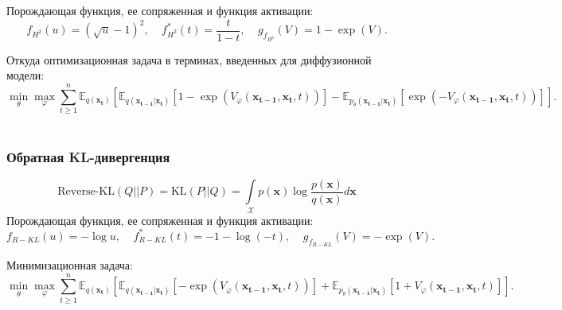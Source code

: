 \documentclass{article}
\begin{document}
Порождающая функция, ее сопряженная и функция активации:
\begin{equation}
	f_{H^2}(u) = (\sqrt{u} - 1)^2, ~~~~~ f^*_{H^2}(t) = \frac{t}{1 - t}, ~~~~~ g_{f_{H^2}}(V) = 1 - \exp(V).
\end{equation}

Откуда оптимизационная задача в терминах, введенных для диффузионной модели:
 \begin{equation}
	\min\limits_\theta\max\limits_\varphi\sum\limits_{t\geqslant 1}^n \mathbb{E}_{q(\mathbf{x_t})}\left[\mathbb{E}_{q(\mathbf{x_{t-1}}|\mathbf{x_t})}[1 - \exp{(V_\varphi(\mathbf{x_{t-1}}, \mathbf{x_t}, t))}] - \mathbb{E}_{p_\theta(\mathbf{x_{t-1}}|\mathbf{x_t})}[\exp{(-V_\varphi(\mathbf{x_{t-1}}, \mathbf{x_t}, t))}]\right].
\end{equation}\\

\subsubsection{Обратная KL-дивергенция}
 \begin{equation}
	\text{Reverse-KL}(Q||P) = \text{KL}(P||Q) = \int\limits_\mathcal{X} p(\mathbf{x})\log{\frac{p(\mathbf{x})}{q(\mathbf{x})}}d\mathbf{x}
\end{equation}
Порождающая функция, ее сопряженная и функция активации:
\begin{equation}
	f_{R-KL}(u) = -\log{u}, ~~~~~ f^*_{R-KL}(t) = -1- \log({-t}),~~~~~ g_{f_{R-KL}}(V) = - \exp(V).
\end{equation}

Минимизационная задача:
\begin{equation}
	\min\limits_\theta\max\limits_\varphi\sum\limits_{t\geqslant 1}^n \mathbb{E}_{q(\mathbf{x_t})}\left[\mathbb{E}_{q(\mathbf{x_{t-1}}|\mathbf{x_t})}[-\exp{(V_\varphi(\mathbf{x_{t-1}}, \mathbf{x_t}, t))}] + \mathbb{E}_{p_\theta(\mathbf{x_{t-1}}|\mathbf{x_t})}[1 + V_\varphi(\mathbf{x_{t-1}}, \mathbf{x_t}, t)]\right].
\end{equation}\\
\end{document}
